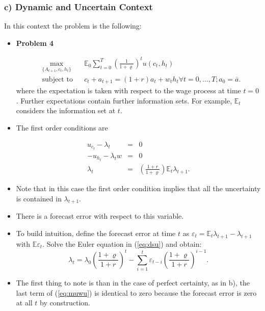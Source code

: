 \documentclass[11pt]{article}
\begin{document}
\subsubsection*{c) Dynamic and Uncertain Context}
In this context the problem is the following:
\begin{itemize}
\item \textbf{Problem 4}

\begin{equation*}
\begin{aligned}
& \underset{\{A_{t+1},c_{t},h_{t}\}}{\text{max}}
& & \mathbb{E}_{0} \sum \limits _{t=0} ^T (\frac{1}{1+\varrho})^{t} u(c_{t},h_{t}) \\
& \text{subject to}
& & c_{t}+a_{t+1}=\left( 1+r\right) a_{t}+w_{t}h_{t}\forall t=0,\ldots ,T; a_{0}=%
\overset{\_}{a}.
\end{aligned}
\end{equation*}
where the expectation is taken with respect to the wage process at time $t=0$. Further expectations contain further information sets. For example, $\mathbb{E}_{t}$ considers the information set at $t$.

\item The first order conditions are

\begin{eqnarray}
u_{c_{t}}-\lambda _{t} &=&0  \nonumber \\ 
-u_{h_{t}}-\lambda _{t}w&=&0 \nonumber \\
\lambda _{t} &=& \left( \frac{1+r}{1+\varrho }\right) \mathbb{E}_{t} \lambda _{t+1} \label{eq:dsu}.
\end{eqnarray} 

\item Note that in this case the first order condition implies that all the uncertainty is contained in $\lambda _{t+1}$. 
\item There is a forecast error with respect to this variable.
\item To build intuition, define the forecast error at time $t$ as $\varepsilon_{t} = \mathbb{E}_{t} \lambda _{t+1}- \lambda _{t+1}$ with $\mathbb{E}\varepsilon_{t}$. Solve the Euler equation in (\ref{eq:dsu}) and obtain:
\begin{equation}
\lambda_{t}=\lambda_{0} \left({\frac{1+\varrho}{1+r}}\right)^t -\sum \limits _{i=1} ^t \varepsilon_{t-i} \left(\frac{1+\varrho}{1+r}\right)^{i-1}. \label{eq:muwu}
\end{equation}
\item The first thing to note is than in the case of perfect certainty, as in b), the last term of (\ref{eq:muwu}) is identical to zero because the forecast error is zero at all $t$ by construction. 
\end{itemize}
\end{document}
